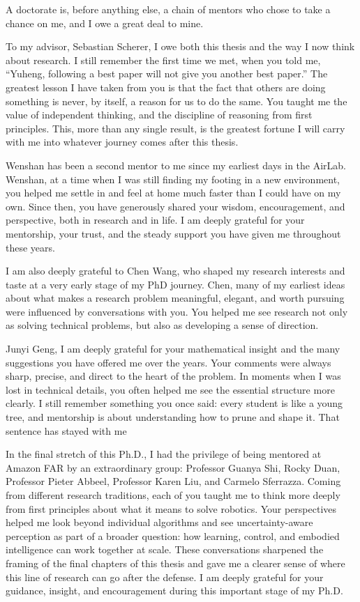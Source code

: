A doctorate is, before anything else, a chain of mentors who chose to take a chance on me, and I owe a great deal to mine.

To my advisor, Sebastian Scherer, I owe both this thesis and the way I now think about research.
I still remember the first time we met, when you told me, “Yuheng, following a best paper will not give you another best paper.” The greatest lesson I have taken from you is that the fact that others are doing something is never, by itself, a reason for us to do the same. You taught me the value of independent thinking, and the discipline of reasoning from first principles. This, more than any single result, is the greatest fortune I will carry with me into whatever journey comes after this thesis.

Wenshan has been a second mentor to me since my earliest days in the AirLab. Wenshan, at a time when I was still finding my footing in a new environment, you helped me settle in and feel at home much faster than I could have on my own. Since then, you have generously shared your wisdom, encouragement, and perspective, both in research and in life.
I am deeply grateful for your mentorship, your trust, and the steady support you have given me throughout these years.

I am also deeply grateful to Chen Wang, who shaped my research interests and taste at a very early stage of my PhD journey. Chen, many of my earliest ideas about what makes a research problem meaningful, elegant, and worth pursuing were influenced by conversations with you. You helped me see research not only as solving technical problems, but also as developing a sense of direction.

Junyi Geng, I am deeply grateful for your mathematical insight and the many suggestions you have offered me over the years. Your comments were always sharp, precise, and direct to the heart of the problem. In moments when I was lost in technical details, you often helped me see the essential structure more clearly. I still remember something you once said: every student is like a young tree, and mentorship is about understanding how to prune and shape it. That sentence has stayed with me

In the final stretch of this Ph.D., I had the privilege of being mentored at Amazon FAR by an extraordinary group: Professor Guanya Shi, Rocky Duan, Professor Pieter Abbeel, Professor Karen Liu, and Carmelo Sferrazza.
Coming from different research traditions, each of you taught me to think more deeply from first principles about what it means to solve robotics. Your perspectives helped me look beyond individual algorithms and see uncertainty-aware perception as part of a broader question: how learning, control, and embodied intelligence can work together at scale.
These conversations sharpened the framing of the final chapters of this thesis and gave me a clearer sense of where this line of research can go after the defense. I am deeply grateful for your guidance, insight, and encouragement during this important stage of my Ph.D.

